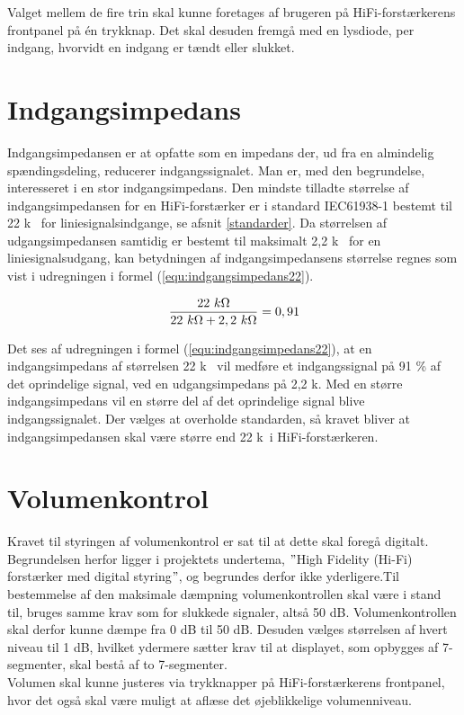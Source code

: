 Valget mellem de fire trin skal kunne foretages af brugeren på HiFi-forstærkerens frontpanel på én trykknap. Det skal desuden fremgå med en lysdiode, per indgang, hvorvidt en indgang er tændt eller slukket.

\section{Indgangsimpedans}
\label{valg_indgangsimpedans}
Indgangsimpedansen er at opfatte som en impedans der, ud fra en almindelig spændingsdeling, reducerer indgangssignalet. Man er, med den begrundelse, interesseret i en stor indgangsimpedans. Den mindste tilladte størrelse af indgangsimpedansen for en HiFi-forstærker er i standard IEC61938-1 bestemt til 22 k\ohm~ for liniesignalsindgange, se afsnit \ref{standarder}. Da størrelsen af udgangsimpedansen samtidig er bestemt til maksimalt 2,2 k\ohm~ for en liniesignalsudgang, kan betydningen af indgangsimpedansens størrelse regnes som vist i udregningen i formel (\ref{equ:indgangsimpedans22}). 

\begin{equation}
\label{equ:indgangsimpedans22}
\frac{22~k\ohm}{22~k\ohm + 2,2~k\ohm} = 0,91
\end{equation}

Det ses af udregningen i formel (\ref{equ:indgangsimpedans22}), at en indgangsimpedans af størrelsen 22 k\ohm~ vil medføre et indgangssignal på 91 \% af det oprindelige signal, ved en udgangsimpedans på 2,2 k\ohm. Med en større indgangsimpedans vil en større del af det oprindelige signal blive indgangssignalet. Der vælges at overholde standarden, så kravet bliver at indgangsimpedansen skal være større end 22 k\ohm~i HiFi-forstærkeren.

\section{Volumenkontrol}
\label{valg_volumenkontrol}
Kravet til styringen af volumenkontrol er sat til at dette skal foregå digitalt. Begrundelsen herfor ligger i projektets undertema, $"$High Fidelity (Hi-Fi) forstærker med digital styring$"$, og begrundes derfor ikke yderligere.Til bestemmelse af den maksimale dæmpning volumenkontrollen skal være i stand til, bruges samme krav som for slukkede signaler, altså 50 dB. Volumenkontrollen skal derfor kunne dæmpe fra  0 dB til 50 dB. Desuden vælges størrelsen af hvert niveau til 1 dB, hvilket ydermere sætter krav til at displayet, som opbygges af 7-segmenter, skal bestå af to 7-segmenter.\\
Volumen skal kunne justeres via trykknapper på HiFi-forstærkerens frontpanel, hvor det også skal være muligt at aflæse det øjeblikkelige volumenniveau.  

